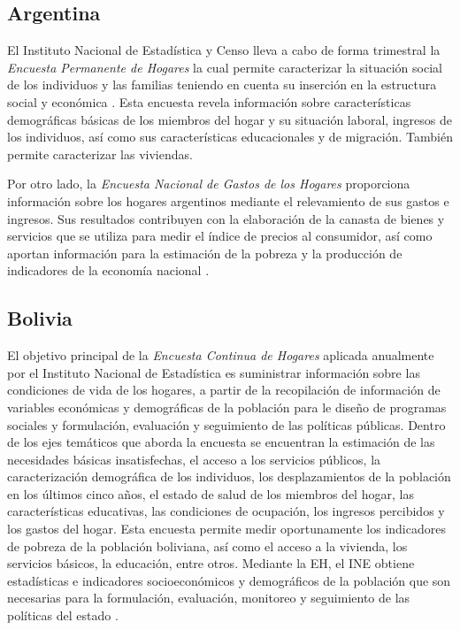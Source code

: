 \documentclass[
  10pt,
  spanish,
]{book}
\begin{document}
\hypertarget{argentina}{%
\subsection*{Argentina}\label{argentina}}

El Instituto Nacional de Estadística y Censo lleva a cabo de forma trimestral la \emph{Encuesta Permanente de Hogares} la cual permite caracterizar la situación social de los individuos y las familias teniendo en cuenta su inserción en la estructura social y económica \citep{INDEC-AR}. Esta encuesta revela información sobre características demográficas básicas de los miembros del hogar y su situación laboral, ingresos de los individuos, así como sus características educacionales y de migración. También permite caracterizar las viviendas.

Por otro lado, la \emph{Encuesta Nacional de Gastos de los Hogares} proporciona información sobre los hogares argentinos mediante el relevamiento de sus gastos e ingresos. Sus resultados contribuyen con la elaboración de la canasta de bienes y servicios que se utiliza para medir el índice de precios al consumidor, así como aportan información para la estimación de la pobreza y la producción de indicadores de la economía nacional \citep{INDEC-AR2}.

\hypertarget{bolivia}{%
\subsection*{Bolivia}\label{bolivia}}

El objetivo principal de la \emph{Encuesta Continua de Hogares} aplicada anualmente por el Instituto Nacional de Estadística es suministrar información sobre las condiciones de vida de los hogares, a partir de la recopilación de información de variables económicas y demográficas de la población para le diseño de programas sociales y formulación, evaluación y seguimiento de las políticas públicas. Dentro de los ejes temáticos que aborda la encuesta se encuentran la estimación de las necesidades básicas insatisfechas, el acceso a los servicios públicos, la caracterización demográfica de los individuos, los desplazamientos de la población en los últimos cinco años, el estado de salud de los miembros del hogar, las características educativas, las condiciones de ocupación, los ingresos percibidos y los gastos del hogar. Esta encuesta permite medir oportunamente los indicadores de pobreza de la población boliviana, así como el acceso a la vivienda, los servicios básicos, la educación, entre otros. Mediante la EH, el INE obtiene estadísticas e indicadores socioeconómicos y demográficos de la población que son necesarias para la formulación, evaluación, monitoreo y seguimiento de las políticas del estado \citep{INE-BO}.
\end{document}
